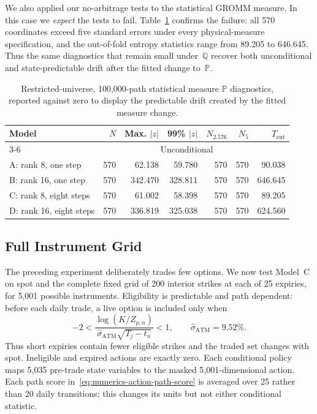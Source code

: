 \documentclass[smallextended,envcountsame,envcountsect]{svjour3}
\newcommand{\Q}{\mathbb Q}
\newcommand{\PP}{\mathbb P}
\newcommand{\abs}[1]{\lvert #1\rvert}
\begin{document}
\begin{remark}
We also applied our no-arbitrage tests to the statistical GROMM measure.
In this case we \emph{expect} the tests to fail.
Table~\ref{tab:numerics-restricted-p} confirms the failure:
all 570 coordinates exceed five standard errors under every physical-measure
specification, and the out-of-fold entropy statistics range from 89.205 to
646.645.  Thus the same diagnostics that remain small under~$\Q$ recover both
unconditional and state-predictable drift after the fitted change to~$\PP$.
\begin{table}[H]
\centering
\small
\begin{tabular}{lrrrrrr}
\toprule
Model & $N$ & Max. $\abs{z}$ & 99\% $\abs{z}$
  & $N_{2.576}$ & $N_5$ & $T_{\mathrm{ent}}$\\
\cmidrule(lr){3-6}
 & & \multicolumn{4}{c}{Unconditional} & \\
\midrule
A: rank 8, one step    & 570 & 62.138 & 59.780 & 570 & 570 & 90.038\\
B: rank 16, one step   & 570 & 342.470 & 328.811 & 570 & 570 & 646.645\\
C: rank 8, eight steps & 570 & 61.002 & 58.398 & 570 & 570 & 89.205\\
D: rank 16, eight steps& 570 & 336.819 & 325.038 & 570 & 570 & 624.560\\
\bottomrule
\end{tabular}
\caption{Restricted-universe, 100,000-path statistical measure $\PP$ diagnostics, reported against
zero to display the predictable drift created by the fitted
measure change.}
\label{tab:numerics-restricted-p}
\end{table}
\end{remark}

\subsection{Full Instrument Grid}
\label{sec:numerics-full-instrument-grid}

The preceding experiment deliberately trades few options.  We now test
Model~C on spot and the complete fixed grid of 200 interior strikes at each of
25 expiries, for 5,001 possible instruments.  Eligibility is predictable and
path dependent: before each daily trade, a live option is included only when
\[
  -2 < \frac{\log(K/Z_{p,n})}
  {\widehat\sigma_{\mathrm{ATM}}\sqrt{T_j-t_n}} < 1,
  \qquad \widehat\sigma_{\mathrm{ATM}}=9.52\%.
\]
Thus short expiries contain fewer eligible strikes and the traded set changes
with spot.  Ineligible and expired actions are exactly zero.  Each conditional
policy maps 5,035 pre-trade state variables to the masked 5,001-dimensional
action.  Each path score in~\eqref{eq:numerics-action-path-score} is averaged
over 25 rather than 20 daily transitions; this changes its units but not either
conditional statistic.
\end{document}
